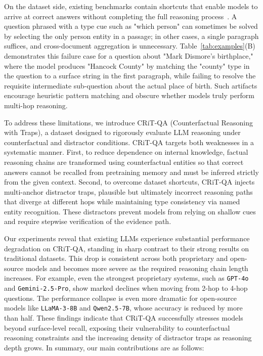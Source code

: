 \documentclass[10pt, a4paper]{article}
\begin{document}
On the dataset side, existing benchmarks contain shortcuts that enable models to arrive at correct answers without completing the full reasoning process~\cite{guo-etal-2023-counterfactual, yang-etal-2024-large-language-models, ho-etal-2023-analyzing}. A question phrased with a type cue such as "which person" can sometimes be solved by selecting the only person entity in a passage; in other cases, a single paragraph suffices, and cross-document aggregation is unnecessary. Table~\ref{tab:examples}(B) demonstrates this failure case for a question about "Mark Dismore's birthplace," where the model produces "Hancock County" by matching the "county" type in the question to a surface string in the first paragraph, while failing to resolve the requisite intermediate sub-question about the actual place of birth. Such artifacts encourage heuristic pattern matching and obscure whether models truly perform multi-hop reasoning.

To address these limitations, we introduce CRiT-QA (Counterfactual Reasoning with Traps), a dataset designed to rigorously evaluate LLM reasoning under counterfactual and distractor conditions. CRiT-QA targets both weaknesses in a systematic manner. First, to reduce dependence on internal knowledge, factual reasoning chains are transformed using counterfactual entities so that correct answers cannot be recalled from pretraining memory and must be inferred strictly from the given context. Second, to overcome dataset shortcuts, CRiT-QA injects multi-anchor distractor traps, plausible but ultimately incorrect reasoning paths that diverge at different hops while maintaining type consistency via named entity recognition. These distractors prevent models from relying on shallow cues and require stepwise verification of the evidence path.

Our experiments reveal that existing LLMs experience substantial performance degradation on CRiT-QA, standing in sharp contrast to their strong results on traditional datasets. This drop is consistent across both proprietary and open-source models and becomes more severe as the required reasoning chain length increases. For example, even the strongest proprietary systems, such as \texttt{GPT-4o} and \texttt{Gemini-2.5-Pro}, show marked declines when moving from 2-hop to 4-hop questions. The performance collapse is even more dramatic for open-source models like \texttt{LLaMA-3-8B} and \texttt{Qwen2.5-7B}, whose accuracy is reduced by more than half. These findings indicate that CRiT-QA successfully stresses models beyond surface-level recall, exposing their vulnerability to counterfactual reasoning constraints and the increasing density of distractor traps as reasoning depth grows. In summary, our main contributions are as follows:
\end{document}

